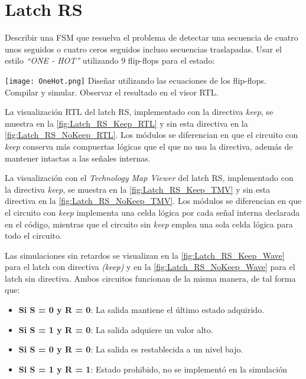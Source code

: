 \section{Latch RS \label{sec:s1}}

\begin{center}
	\begin{minipage}{12cm}
		\begin{tcolorbox}[title=Actividad 1]
			Describir una FSM que resuelva el problema de detectar una secuencia de cuatro unos seguidos o cuatro ceros seguidos incluso secuencias traslapadas. Usar el estilo \textit{``ONE - HOT''} utilizando 9 flip-flops para el estado:\enter
			
				\texttt{[image: OneHot.png]}
			Diseñar utilizando las ecuaciones de los flip-flops. Compilar y simular. Observar el resultado en el visor RTL.
		\end{tcolorbox}	
	\end{minipage}
\end{center}

La visualización RTL del latch RS, implementado con la directiva \textit{keep}, se muestra en la \autoref{fig:Latch_RS_Keep_RTL} y sin esta directiva en la \autoref{fig:Latch_RS_NoKeep_RTL}. Los módulos se diferencian en que el circuito con \textit{keep} conserva más compuertas lógicas que el que no usa la directiva, además de mantener intactas a las señales internas.

La visualización con el \textit{Technology Map Viewer} del latch RS, implementado con la directiva \textit{keep}, se muestra en la \autoref{fig:Latch_RS_Keep_TMV} y sin esta directiva en la \autoref{fig:Latch_RS_NoKeep_TMV}. Los módulos se diferencian en que el circuito con \textit{keep} implementa una celda lógica por cada señal interna declarada en el código, mientras que el circuito sin \textit{keep} emplea una sola celda lógica para todo el circuito.

Las simulaciones sin retardos se visualizan en la \autoref{fig:Latch_RS_Keep_Wave} para el latch con directiva \textit{(keep)} y en la \autoref{fig:Latch_RS_NoKeep_Wave} para el latch sin directiva. Ambos circuitos funcionan de la misma manera, de tal forma que:

\begin{itemize}
	\item \textbf{Si S = 0 y R = 0}: La salida mantiene el último estado adquirido.
	\item \textbf{Si S = 1 y R = 0}: La salida adquiere un valor alto.
	\item \textbf{Si S = 0 y R = 0}: La salida es restablecida a un nivel bajo.
	\item \textbf{Si S = 1 y R = 1}: Estado prohibido, no se implementó en la simulación
\end{itemize}

